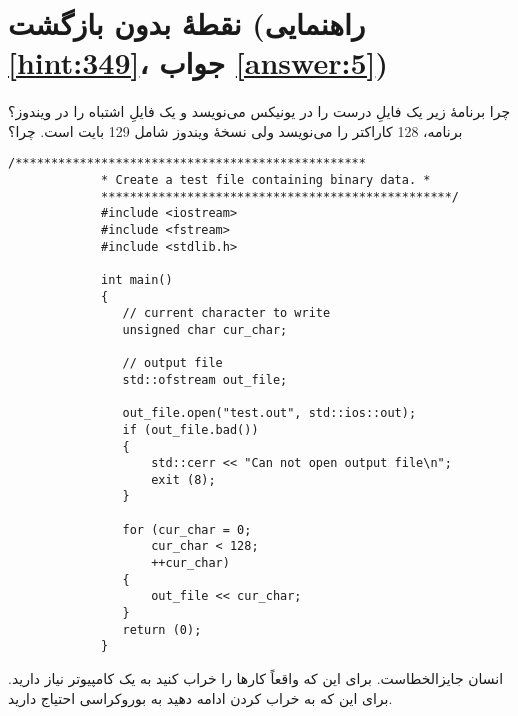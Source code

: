 \section[نقطهٔ بدون بازگشت]{نقطهٔ بدون بازگشت \protect{} (راهنمایی \ref{hint:349}، جواب \ref{answer:5})}
\paragraph{}\label{prog:101}
چرا برنامهٔ زیر یک فایلِ درست را در یونیکس می‌نویسد و یک فایلِ اشتباه را در ویندوز؟ برنامه، 128 کاراکتر را می‌نویسد ولی نسخهٔ ویندوز شامل 129 بایت است. چرا؟

\begin{LTR}
        \begin{lstlisting}[style=C++Style]
             /*************************************************
             * Create a test file containing binary data. *
             *************************************************/
             #include <iostream>
             #include <fstream>
             #include <stdlib.h>

             int main()
             {
            	// current character to write
             	unsigned char cur_char;

             	// output file
             	std::ofstream out_file;

             	out_file.open("test.out", std::ios::out);
             	if (out_file.bad())
             	{
             		std::cerr << "Can not open output file\n";
             		exit (8);
             	}

             	for (cur_char = 0;
             		cur_char < 128;
             		++cur_char)
             	{
             		out_file << cur_char;
             	}
             	return (0);
             }
        \end{lstlisting}
\end{LTR}


\begin{tcolorbox}
    انسان جایزالخطاست. برای این که واقعاً کارها را خراب کنید به یک کامپیوتر نیاز دارید. برای این که به خراب کردن ادامه دهید به بوروکراسی احتیاج دارید.
\end{tcolorbox}